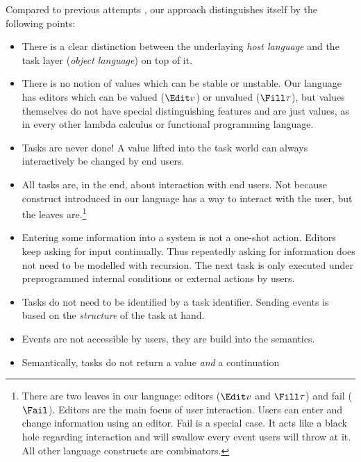 Compared to previous attempts \cite{conf/ifl/KoopmanPA08,conf/ppdp/PlasmeijerLMAK12,theses/radboud/VinterHviid18},
our approach distinguishes itself by the following points:
\begin{itemize}
  \item
    There is a clear distinction between the underlaying \emph{host language}
    and the task layer (\emph{object language}) on top of it.
  \item
    There is no notion of values which can be stable or unstable.
    Our language has editors which can be valued ($\Edit v$) or unvalued ($\Fill \tau$),
    but values themselves do not have special distinguishing features and are just values,
    as in every other lambda calculus or functional programming language.
  \item
    Tasks are never done!
    A value lifted into the task world can always interactively be changed by end users.
  \item
    All tasks are, in the end, about interaction with end users.
    Not because construct introduced in our language has a way to interact with the user,
    but the leaves are.\footnote{
      There are two leaves in our language: editors ($\Edit v$ and $\Fill \tau$) and fail ($\Fail$).
      Editors are the main focus of user interaction.
      Users can enter and change information using an editor.
      Fail is a special case.
      It acts like a black hole regarding interaction and will swallow every event users will throw at it.
      All other language constructs are combinators.
    }
  \item
    Entering some information into a system is not a one-shot action.
    Editors keep asking for input continually.
    Thus repeatedly asking for information does not need to be modelled with recursion.
    The next task is only executed under preprogrammed internal conditions or external actions by users.
  \item
    Tasks do not need to be identified by a task identifier.
    Sending events is based on the \emph{structure} of the task at hand.
  \item
    Events are not accessible by users, they are build into the semantics.
  \item
    Semantically, tasks do not return a value \emph{and} a continuation

\end{itemize}
